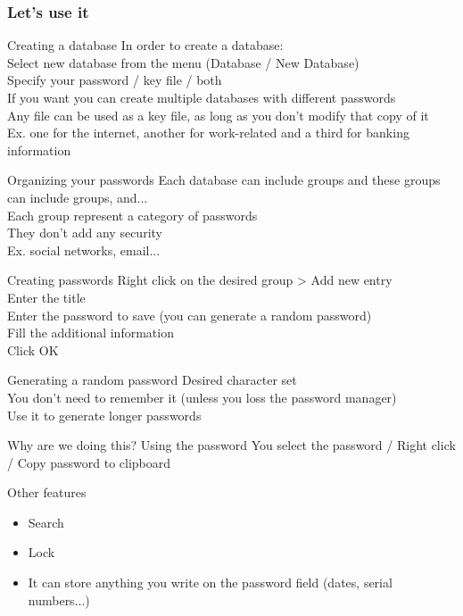 \documentclass[11pt]{beamer}
\begin{document}
\subsubsection{Let's use it}
\begin{frame}{Creating a database}
In order to create a database:\\
Select new database from the menu (Database / New Database)\\
Specify your password / key file / both\\
If you want you can create multiple  databases with different passwords\\
Any file can be used  as a key file, as long as you don't modify that copy of it\\
Ex. one for the internet, another for work-related  and a third for banking information
\end{frame}
\begin{frame}{Organizing your passwords}
Each database can include groups and these groups can include groups, and...\\
Each group  represent a category of passwords\\
They don't add  any security\\
Ex. social networks, email...
\end{frame}
\begin{frame}{Creating passwords}
Right click on the desired group > Add new entry\\
Enter the title\\
Enter the password to save (you can generate a random password)\\
Fill the additional information\\
Click OK
\end{frame}
\begin{frame}{Generating a random password}
Desired character set\\
You don't need to remember it (unless you loss the password manager)\\
Use it to generate longer passwords
\end{frame}
\begin{frame}{Why are we doing this? Using the password}
You select the password / Right click / Copy password to clipboard
\end{frame}
\begin{frame}{Other features}
\begin{itemize}
\item Search
\item Lock
\item It can store anything you write on the password field (dates, serial numbers...)
\end{itemize}
\end{frame}
\end{document}
